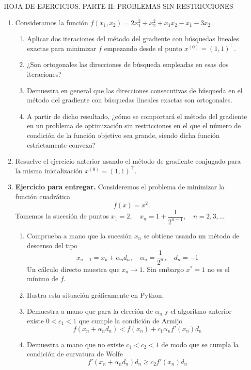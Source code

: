 


\begin{center}
HOJA DE EJERCICIOS. PARTE II: PROBLEMAS SIN RESTRICCIONES
\end{center}
\begin{enumerate}
	\item Consideramos la función $f(x_1,x_2)=2x_1^2+x_2^2+x_1x_2-x_1-3x_2$
	\begin{enumerate}[label=\alph*)]
		\item Aplicar dos iteraciones del método del gradiente con búsquedas lineales exactas para minimizar $f$ empezando desde el punto $x^{(0)}=(1,1)^\intercal$.
		\item ¿Son ortogonales las direcciones de búsqueda empleadas en esas dos iteraciones?
		\item Demuestra en general que las direcciones consecutivas de búsqueda en el método del gradiente con búsquedas lineales exactas son ortogonales.
		\item A partir de dicho resultado, ¿cómo se comportará el método del gradiente en un problema de optimización sin restricciones en el que el número de condición de la función objetivo sea grande, siendo dicha función estrictamente convexa?
	\end{enumerate}
	\item Resuelve el ejercicio anterior usando el método de gradiente conjugado para la misma inicialización $x^{(0)}=(1,1)^{\intercal}.$
	\item \textbf{Ejercicio para entregar.} Consideremos el problema de minimizar la función cuadrática \[ f(x)=x^2. \]Tomemos la sucesión de puntos $x_1=2,\quad  x_n=1+\dfrac{1}{2^{n-1}},\quad n=2,3,\dots$
	\begin{enumerate}[label=\arabic*)]
		\item Comprueba a mano que la sucesión $x_n$ se obtiene usando un método de descenso del tipo \[ x_{n+1}=x_k+\alpha_nd_n,\quad\alpha_n=\dfrac{1}{2^n},\quad d_n=-1 \] Un cálculo directo muestra que $x_n\rightarrow1$. Sin embargo $x^*=1$ no es el mínimo de $f$.
		\item Ilustra esta situación gráficamente en Python.
		\item Demuestra a mano que para la elección de $\alpha_n$ y el algoritmo anterior existe $0<c_1<1$ que cumple la condición de Armijo \[ f(x_n+\alpha_nd_n)<f(x_n)+c_1\alpha_nf'(x_n)d_n \]
		\item Demuestra a mano que no existe $c_1<c_2<1$ de modo que se cumpla la condición de curvatura de Wolfe \[ f'(x_n+\alpha_nd_n)d_n\ge c_2f'(x_n)d_n \]

\end{enumerate}
\end{enumerate}

